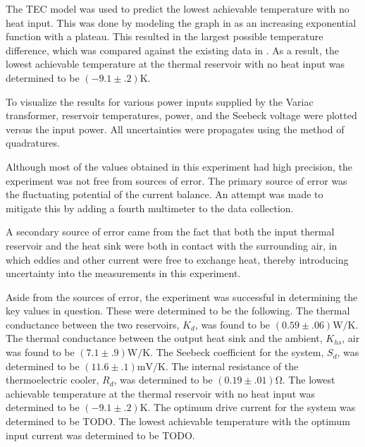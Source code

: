 \begin{paper}
	The TEC model was used to predict the lowest achievable temperature with no heat input. This was done by modeling the graph in \figpartTwoa as an increasing exponential function with a plateau. This resulted in the largest possible temperature difference, which was compared against the existing data in \figPartTwoA. As a result, the lowest achievable temperature at the thermal reservoir with no heat input was determined to be $(-9.1\pm.2)\si{\kelvin}$.
	
	To visualize the results for various power inputs supplied by the Variac transformer, reservoir temperatures, power, and the Seebeck voltage were plotted versus the input power. All uncertainties were propagates using the method of quadratures.
	
	
	
	

	Although most of the values obtained in this experiment had high precision, the experiment was not free from sources of error. The primary source of error was the fluctuating potential of the current balance. An attempt was made to mitigate this by adding a fourth multimeter to the data collection.

	A secondary source of error came from the fact that both the input thermal reservoir and the heat sink were both in contact with the surrounding air, in which eddies and other current were free to exchange heat, thereby introducing uncertainty into the measurements in this experiment.
	
	Aside from the sources of error, the experiment was successful in determining the key values in question. These were determined to be the following.
The thermal conductance between the two reservoirs, $K_d$, was found to be $(0.59\pm.06)\si{\watt\per\kelvin}$.
The thermal conductance between the output heat sink and the ambient, $K_{hs}$, air was found to be $(7.1\pm.9)\si{\watt\per\kelvin}$.
The Seebeck coefficient for the system, $S_d$, was determined to be $(11.6\pm.1)\si{\milli\volt\per\kelvin}$.
The internal resistance of the thermoelectric cooler, $R_d$, was determined to be $(0.19\pm.01)\si{\ohm}$.
The lowest achievable temperature at the thermal reservoir with no heat input was determined to be $(-9.1\pm.2)\si{\kelvin}$.
The optimum drive current for the system was determined to be TODO.
The lowest achievable temperature with the optimum input current was determined to be TODO.



\end{paper}
